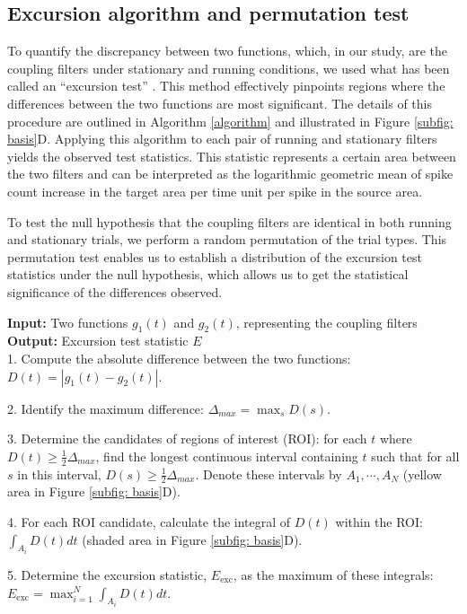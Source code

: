 \documentclass[12pt]{article}
\begin{document}
\subsection{Excursion algorithm and permutation test}
To quantify the discrepancy between two functions, which, in our study, are the coupling filters under stationary and running conditions, we used what has been called an ``excursion test'' \cite{xu2011characterizing}. This method effectively pinpoints regions where the differences between the two functions are most significant. The details of this procedure are outlined in Algorithm \ref{algorithm} and illustrated in Figure \ref{subfig: basis}D. Applying this algorithm to each pair of running and stationary filters yields the observed test statistics. This statistic represents a certain area between the two filters and can be interpreted as the logarithmic geometric mean of spike count increase in the target area per time unit per spike in the source area.

To test the null hypothesis that the coupling filters are identical in both running and stationary trials, we perform a random permutation of the trial types. This permutation test enables us to establish a distribution of the excursion test statistics under the null hypothesis, which allows us to get the statistical significance of the differences observed. 


\begin{algorithm}
\caption{Excursion algorithm}
\label{algorithm}
\textbf{Input:} Two functions $ g_1(t) $ and $ g_2(t)$, representing the coupling filters \\
\textbf{Output:} Excursion test statistic $E$ \\
1. Compute the absolute difference between the two functions: $D(t)=\left| g_1(t)-g_2(t) \right|$.

2. Identify the maximum difference: $\Delta_{max}=\max_s D(s)$.

3. Determine the candidates of regions of interest (ROI): for each $t$ where $D(t) \geq \frac{1}{2} \Delta_{max}$, find the longest continuous interval containing $t$ such that for all $s$ in this interval, $D(s) \geq \frac{1}{2} \Delta_{max}$. Denote these intervals by $A_1, \cdots, A_N$ (yellow area in Figure \ref{subfig: basis}D).

4. For each ROI candidate, calculate the integral of $D(t)$ within the ROI: $\int_{A_i} D(t)dt$ (shaded area in Figure \ref{subfig: basis}D).

5. Determine the excursion statistic, $E_{\text{exc}}$, as the maximum of these integrals: $E_{\text{exc}} = \max_{i=1}^N \int_{A_i} D(t)dt$.
 
\end{algorithm}
\end{document}
